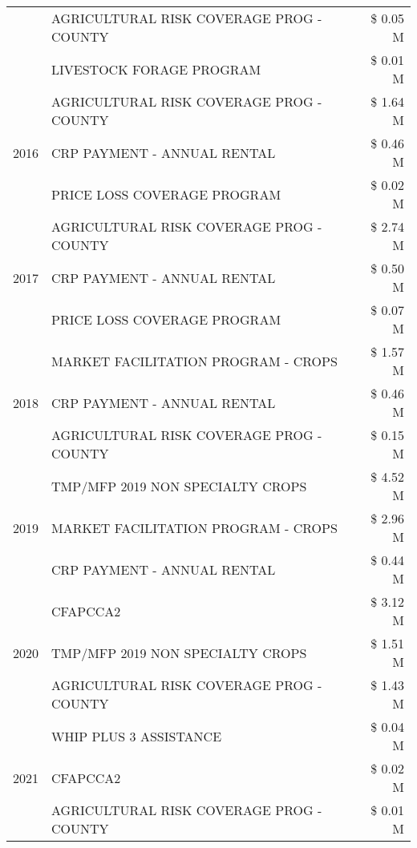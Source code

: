 \begin{tabular}{llr}
 & AGRICULTURAL RISK COVERAGE PROG - COUNTY & \$ 0.05 M \\
 & LIVESTOCK FORAGE PROGRAM & \$ 0.01 M \\
\cline{1-3}
\multirow[t]{3}{*}{2016} & AGRICULTURAL RISK COVERAGE PROG - COUNTY      & \$ 1.64 M \\
 & CRP PAYMENT - ANNUAL RENTAL                   & \$ 0.46 M \\
 & PRICE LOSS COVERAGE PROGRAM                   & \$ 0.02 M \\
\cline{1-3}
\multirow[t]{3}{*}{2017} & AGRICULTURAL RISK COVERAGE PROG - COUNTY & \$ 2.74 M \\
 & CRP PAYMENT - ANNUAL RENTAL & \$ 0.50 M \\
 & PRICE LOSS COVERAGE PROGRAM & \$ 0.07 M \\
\cline{1-3}
\multirow[t]{3}{*}{2018} & MARKET FACILITATION PROGRAM - CROPS & \$ 1.57 M \\
 & CRP PAYMENT - ANNUAL RENTAL & \$ 0.46 M \\
 & AGRICULTURAL RISK COVERAGE PROG - COUNTY & \$ 0.15 M \\
\cline{1-3}
\multirow[t]{3}{*}{2019} & TMP/MFP 2019 NON SPECIALTY CROPS & \$ 4.52 M \\
 & MARKET FACILITATION PROGRAM - CROPS & \$ 2.96 M \\
 & CRP PAYMENT - ANNUAL RENTAL & \$ 0.44 M \\
\cline{1-3}
\multirow[t]{3}{*}{2020} & CFAPCCA2 & \$ 3.12 M \\
 & TMP/MFP 2019 NON SPECIALTY CROPS & \$ 1.51 M \\
 & AGRICULTURAL RISK COVERAGE PROG - COUNTY & \$ 1.43 M \\
\cline{1-3}
\multirow[t]{3}{*}{2021} & WHIP PLUS 3 ASSISTANCE & \$ 0.04 M \\
 & CFAPCCA2 & \$ 0.02 M \\
 & AGRICULTURAL RISK COVERAGE PROG - COUNTY & \$ 0.01 M \\
\cline{1-3}
\bottomrule
\end{tabular}

